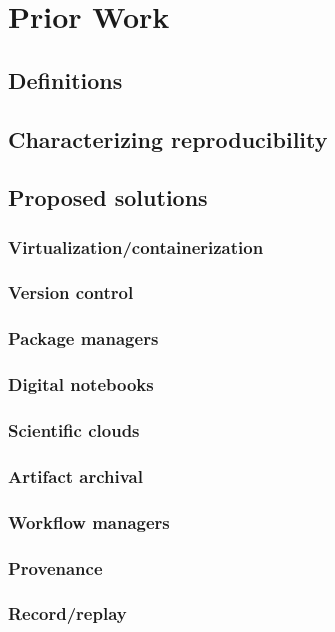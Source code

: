 \section{Prior Work}

\subsection{Definitions}

\subsection{Characterizing reproducibility}

\subsection{Proposed solutions}

\subsubsection{Virtualization/containerization}

\subsubsection{Version control}

\subsubsection{Package managers}

\subsubsection{Digital notebooks}

\subsubsection{Scientific clouds}

\subsubsection{Artifact archival}

\subsubsection{Workflow managers}

\subsubsection{Provenance}

\subsubsection{Record/replay}
